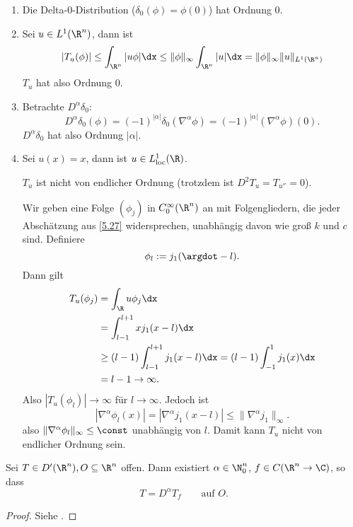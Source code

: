 \begin{ex} \label{5.28}
	\begin{enumerate}[1)]
		\item
			Die Delta-0-Distribution ($\delta_0(\phi) = \phi(0)$) hat Ordnung 0.
		\item
			Sei $u \in L^1(\R^n)$, dann ist
			\[
				|T_u(\phi)|
				\le \int_{\R^n} |u \phi| \dx
				\le \|\phi\|_\infty \int_{\R^n} |u| \dx
				= \|\phi\|_\infty \|u\|_{L^1(\R^n)}
			\]
			$T_u$ hat also Ordnung 0.
		\item
			Betrachte $D^\alpha \delta_0$:
			\[
				D^\alpha \delta_0(\phi)
				= (-1)^{|\alpha|} \delta_0(\nabla^\alpha \phi)
				= (-1)^{|\alpha|} (\nabla^\alpha \phi)(0).
			\]
			$D^\alpha \delta_0$ hat also Ordnung $|\alpha|$.
		\item
			Sei $u(x) = x$, dann ist $u \in L^1_{\text{loc}}(\R)$.

			$T_u$ ist nicht von endlicher Ordnung (trotzdem ist $D^2 T_u = T_{u''} = 0$).

			Wir geben eine Folge $(\phi_j)$ in $C_0^\infty(\R^n)$ an mit Folgengliedern, die jeder Abschätzung aus \ref{5.27} widersprechen, unabhängig davon wie groß $k$ und $c$ sind.
			Definiere
			\[
				\phi_l := j_1 ( \argdot - l).
			\]
			Dann gilt
			\begin{align*}
				T_u (\phi_j)
				&= \int_{\R} u \phi_j \dx \\
				&= \int_{l-1}^{l+1} x j_1(x-l) \dx \\
				&\ge (l-1) \int_{l-1}^{l+1} j_1(x-l) \dx
				= (l-1) \int_{-1}^1 j_1(x) \dx \\
				&= l-1
				\to \infty.
			\end{align*}
			Also $|T_u(\phi_l)| \to \infty$ für $l \to \infty$.
			Jedoch ist
			\[
				| \nabla^\alpha \phi_l(x) |
				= |\nabla^\alpha j_1(x-l) |
				\le \|\nabla^\alpha j_1 \|_\infty.
			\]
			also $\|\nabla^\alpha \phi_l \|_\infty \le \const$ unabhängig von $l$.
			Damit kann $T_u$ nicht von endlicher Ordnung sein.
	\end{enumerate}
\end{ex}

\begin{nt} \label{5.29}
	Sei $T \in D'(\R^n), O \subset \R^n$ offen.
	Dann existiert $\alpha \in \N_0^n$, $f \in C(\R^n \to \C)$, so dass
	\[
		T = D^\alpha T_f
		\qquad \text{auf $O$.}
	\]
	\begin{proof}
		Siehe \cite{walter94}.
	\end{proof}
\end{nt}

